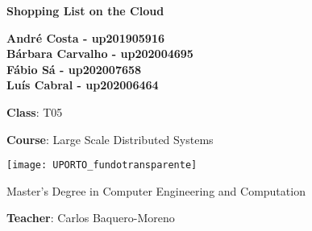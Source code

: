 \documentclass[sigconf, authorversion, nonacm]{acmart}
\begin{document}
\begin{titlepage}
	\begin{center}
		\vspace*{1cm}
		
    {\fontsize{15}{16}\selectfont \textbf{Shopping List on the Cloud}}
		
		\vspace{1.5cm}
		
		\textbf{André Costa - up201905916}\\
		\textbf{Bárbara Carvalho - up202004695}\\
		\textbf{Fábio Sá - up202007658}\\
		\textbf{Luís Cabral - up202006464}\\

            \vspace{0.8cm}

            \textbf{Class}: T05

            \vspace{0.4cm}

            \textbf{Course}: Large Scale Distributed Systems
		
				\vfill
		
		\texttt{[image: UPORTO\_fundotransparente]}
		
		\vfill
		
	
		
		Master's Degree in Computer Engineering and Computation
		
		\vspace{0.8cm}

            \textbf{Teacher}: Carlos Baquero-Moreno\\
		
	\end{center}
\end{titlepage}



\end{document}
